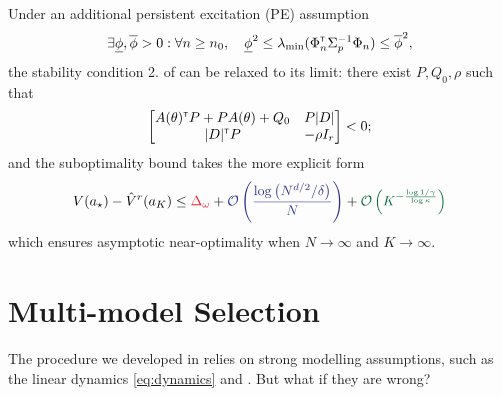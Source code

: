 \documentclass{article}
\begin{document}
\begin{corollary}
	\label{cor:pe}
		Under an additional persistent excitation (PE) assumption
		\begin{align}
		\label{eq:pe}
		\exists \underline{\phi},\overline{\phi}>0: \forall n\geq n_0,\quad \underline{\phi}^2 \leq \lambda_{\min}(\Phi_{n}^{\mathsf{\scriptscriptstyle T}}\Sigma_{p}^{-1}\Phi_{n}) \leq \overline{\phi}^2,
		\end{align} the stability condition 2. of  can be relaxed to its limit: there exist $P,Q_0,\rho$ such that
		$$\begin{bmatrix}
		A(\theta)^{\mathsf{\scriptscriptstyle T}} P + P A(\theta) + Q_0 & P|D|  \\
		|D|^{\mathsf{\scriptscriptstyle T}} P & -\rho I_r \\
		\end{bmatrix}< 0;$$
		and the suboptimality bound takes the more explicit form
		\begin{equation*}
		V(a_\star) - \hat{V}^r(a_K) \leq  \hlr{{\Delta_\omega}} + \hlb{{\cO\left(\frac{\log\left(N^{d/2}/\delta\right)}{N}\right)}} + \hlg{{\cO\left(K^{-\frac{\log 1/\gamma}{\log \kappa}}\right)}} 
		\end{equation*}
		which ensures asymptotic near-optimality when $N\to\infty$ and $K\to\infty$.
\end{corollary}


\section{Multi-model Selection}
\label{sec:multi-model}

The procedure we developed in  relies on strong modelling assumptions, such as the linear dynamics \eqref{eq:dynamics} and . But what if they are wrong?
\end{document}
